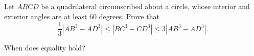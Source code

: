 Let $ABCD$ be a quadrilateral circumscribed about a circle, whose interior and exterior angles are at least 60 degrees. Prove that\[ 

\frac{1}{3}|AB^3 - AD^3| \le |BC^3 - CD^3| \le 3|AB^3 - AD^3|. 

\]

When does equality hold?